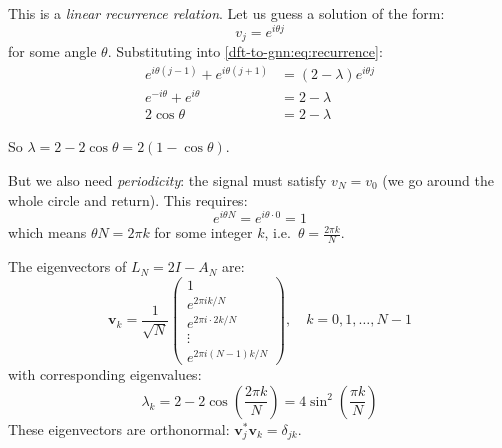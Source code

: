 \begin{notechapter}
This is a \emph{linear recurrence relation}. Let us guess a solution
of the form:
\begin{equation}
v_j = e^{i\theta j}
\end{equation}
for some angle $\theta$. Substituting into \eqref{dft-to-gnn:eq:recurrence}:
\begin{align}
e^{i\theta(j-1)} + e^{i\theta(j+1)} &= (2 - \lambda) e^{i\theta j} \\
e^{-i\theta} + e^{i\theta} &= 2 - \lambda \\
2\cos\theta &= 2 - \lambda
\end{align}

So $\lambda = 2 - 2\cos\theta = 2(1 - \cos\theta)$.

But we also need \emph{periodicity}: the signal must satisfy
$v_N = v_0$ (we go around the whole circle and return). This requires:
\begin{equation}
e^{i\theta N} = e^{i\theta \cdot 0} = 1
\end{equation}
which means $\theta N = 2\pi k$ for some integer $k$, i.e.\
$\theta = \frac{2\pi k}{N}$.

\begin{theorem}
\label{dft-to-gnn:thm:circular-eigenvectors}
The eigenvectors of $L_N = 2I - A_N$ are:
\begin{equation}
\mathbf{v}_k = \frac{1}{\sqrt{N}}
\begin{pmatrix}
1 \\ e^{2\pi i k/N} \\ e^{2\pi i \cdot 2k/N} \\ \vdots \\
e^{2\pi i (N-1)k/N}
\end{pmatrix}, \quad k = 0, 1, \ldots, N-1
\end{equation}
with corresponding eigenvalues:
\begin{equation}
\lambda_k = 2 - 2\cos\left(\frac{2\pi k}{N}\right)
          = 4\sin^2\left(\frac{\pi k}{N}\right)
\end{equation}
These eigenvectors are orthonormal:
$\mathbf{v}_j^* \mathbf{v}_k = \delta_{jk}$.
\end{theorem}

\begin{figure}[H]
\centering
{}
\end{figure}
\end{notechapter}
